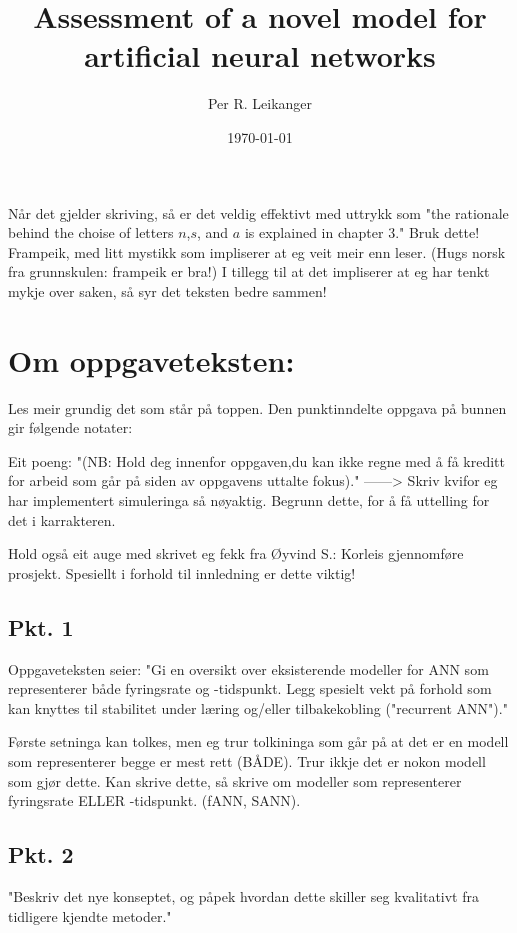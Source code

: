\documentclass[a4paper,11 pt]{report}
\author{Per R. Leikanger}
\title{Assessment of a novel model for artificial neural networks}
\date{\today}
\begin{document}
   

\maketitle



Når det gjelder skriving, så er det veldig effektivt med uttrykk som "the rationale behind the choise of letters $n$,$s$, and $a$ is explained in chapter 3."
Bruk dette! 
Frampeik, med litt mystikk som impliserer at eg veit meir enn leser. (Hugs norsk fra grunnskulen: frampeik er bra!)
I tillegg til at det impliserer at eg har tenkt mykje over saken, så syr det teksten bedre sammen!


\chapter{Om oppgaveteksten:}
Les meir grundig det som står på toppen. Den punktinndelte oppgava på bunnen gir følgende notater:

Eit poeng: "(NB: Hold deg innenfor oppgaven,du kan ikke regne med å få
kreditt for arbeid som går på siden av oppgavens uttalte fokus)."
------> Skriv kvifor eg har implementert simuleringa så nøyaktig. Begrunn dette, for å få uttelling for det i karrakteren. 

Hold også eit auge med skrivet eg fekk fra Øyvind S.: Korleis gjennomføre prosjekt. Spesiellt i forhold til innledning er dette viktig!
	\section{Pkt. 1}
Oppgaveteksten seier: "Gi en oversikt over eksisterende modeller for ANN som representerer både fyringsrate og -tidspunkt. 
Legg spesielt vekt på forhold som kan knyttes til stabilitet under læring og/eller tilbakekobling ("recurrent ANN")."

Første setninga kan tolkes, men eg trur tolkininga som går på at det er en modell som representerer begge er mest rett (BÅDE). 
Trur ikkje det er nokon modell som gjør dette. Kan skrive dette, så skrive om modeller som representerer fyringsrate ELLER -tidspunkt. (fANN, SANN).


	\section{Pkt. 2}
"Beskriv det nye konseptet, og påpek hvordan dette skiller seg kvalitativt fra tidligere kjendte metoder."
\end{document}

